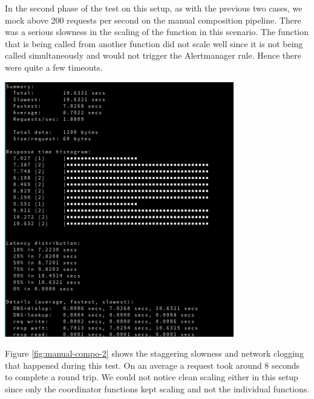 \documentclass[12pt,titlepage]{article}
\begin{document}
In the second phase of the test on this setup, as with the previous two cases, 
we mock above 200 requests per second on the manual composition pipeline. There
was a serious slowness in the scaling of the function in this scenario. The
function that is being called from another function did not scale well since it
is not being called simultaneously and would not trigger the Alertmanager rule.
Hence there were quite a few timeouts. 
\begin{center}
   \begin{minipage}{\linewidth}
    \centering
    \includegraphics[width=100mm]{./thesis_images/manual-compo-2.png}
    \label{fig:manual-compo-2}
   \end{minipage}
\end{center}
Figure \ref{fig:manual-compo-2} shows the staggering slowness and network
clogging that happened during this test. On an average a request took around 8
seconds to complete a round trip. We could not notice clean scaling either in
this setup since only the coordinator functions kept scaling and not the
individual functions.
\end{document}
